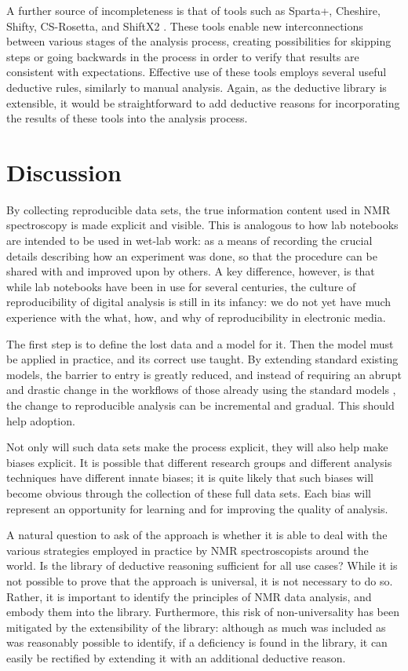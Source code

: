 A further source of incompleteness is that of tools such as Sparta+, Cheshire, 
Shifty, CS-Rosetta, and ShiftX2 \cite{sparta+, cheshire, shiftx2, cs-rosetta, shifty}.
These tools enable new interconnections between various stages of the analysis
process, creating possibilities for skipping steps or going backwards in the
process in order to verify that results are consistent with expectations.  
Effective use of these tools employs several useful deductive rules, similarly
to manual analysis.  Again, as the deductive library is extensible, it would be
straightforward to add deductive reasons for incorporating the results of these
tools into the analysis process.


\section{Discussion}
By collecting reproducible data sets, the true information content used in
NMR spectroscopy is made explicit and visible.  This is analogous to how lab
notebooks are intended to be used in wet-lab work: as a means of recording
the crucial details describing how an experiment was done, so that the procedure
can be shared with and improved upon by others.  A key difference, however, is
that while lab notebooks have been in use for several centuries, the culture
of reproducibility of digital analysis is still in its infancy: we do not yet
have much experience with the what, how, and why of reproducibility in 
electronic media.

The first step is to define the lost data and a model for it.
Then the model must be applied in practice, and its correct use taught.
By extending standard existing models, the barrier to entry is greatly reduced,
and instead of requiring an abrupt and drastic change in the workflows of those
already using the standard models \cite{bmrb, ccpn}, the change to reproducible
analysis can be incremental and gradual.  This should help adoption.

Not only will such data sets make the process explicit, they will also help
make biases explicit.  It is possible that different research groups and
different analysis techniques have different innate biases; it is quite likely
that such biases will become obvious through the collection of these full data
sets.  Each bias will represent an opportunity for learning and for improving
the quality of analysis.

A natural question to ask of the approach is whether it is able to deal with 
the various strategies employed in practice by NMR spectroscopists around the
world.  Is the library of deductive reasoning sufficient for all use cases?
While it is not possible to prove that the approach is universal, it is not
necessary to do so.  Rather, it is important to identify the principles of
NMR data analysis, and embody them into the library.  Furthermore, this risk
of non-universality has been mitigated by the extensibility of the library:
although as much was included as was reasonably possible to identify, if 
a deficiency is found in the library, it can easily be rectified by extending
it with an additional deductive reason.


